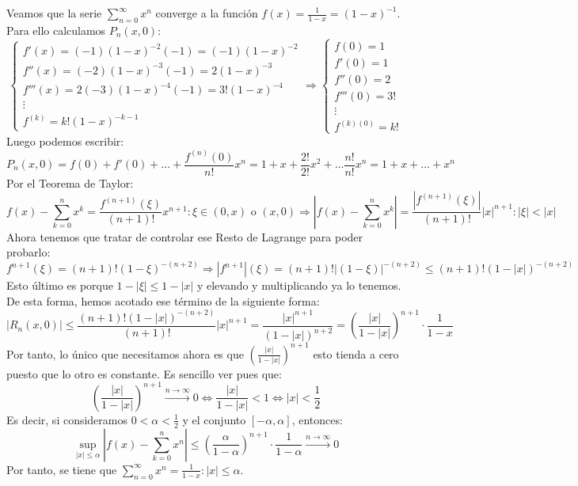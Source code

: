 \documentclass[10pt,a4paper,openright]{book}
\begin{document}
Veamos que la serie $\sum_{n = 0}^{\infty} x^n$ converge a la función $f(x) = \frac{1}{1-x} = (1-x)^{-1}$. Para ello calculamos $P_n(x,0)$:
$$\begin{cases} f'(x) = (-1) (1-x)^{-2} (-1) = (-1) (1-x)^{-2} \\
f''(x) = (-2) (1-x)^{-3} (-1) = 2 (1-x)^{-3} \\
f'''(x) = 2 (-3) (1-x)^{-4} (-1) = 3! (1-x)^{-4} \\
\vdots \\
f^{(k)} = k! (1-x)^{-k - 1}
\end{cases} \Rightarrow \begin{cases} f(0) = 1 \\ f'(0) = 1 \\ f''(0) = 2 \\ f'''(0) = 3! \\ \vdots \\ f^{(k)(0)} = k! \end{cases}$$
Luego podemos escribir:
$$P_n (x, 0) = f(0) + f'(0) + \ldots + \frac{f^{(n)} (0)}{n!} x^n = 1+  x + \frac{2!}{2!} x^2 + \ldots \frac{n!}{n!} x^n = 1+ x + \ldots + x^n$$
Por el Teorema de Taylor:
$$f(x) - \sum_{k=0}^{n} x^k = \frac{f^{(n+1)}(\xi)}{(n+1)!} x^{n+1} : \xi \in (0,x) \mbox{ o } (x, 0) \Rightarrow \left| f(x) - \sum_{k=0}^{n} x^k \right|= \frac{|f^{(n+1)} (\xi)|}{(n+1)!} |x|^{n+1} : |\xi| < |x|$$
Ahora tenemos que tratar de controlar ese Resto de Lagrange para poder probarlo:
$$f^{n+1} (\xi) = (n+1)! (1-\xi)^{- (n+2)} \Rightarrow |f^{n+1}| (\xi) = (n+1)! |(1-\xi)|^{- (n+2)} \leq (n+1)! (1 - |x|)^{- (n+2)} $$
Esto último es porque $1-|\xi| \leq 1 - |x|$ y elevando y multiplicando ya lo tenemos. De esta forma, hemos acotado ese término de la siguiente forma:
$$|R_n (x,0) | \leq \frac{(n+1) ! (1 - |x|)^{- (n+2)} }{(n+1)!} |x|^{n+1} = \frac{|x|^{n+1}}{(1 - |x|)^ {n+2}} = \left(\frac{|x|}{1-|x|}\right)^{n+1} \cdot \frac{1}{1-x}$$
Por tanto, lo único que necesitamos ahora es que $\left(\frac{|x|}{1-|x|}\right)^{n+1}$ esto tienda a cero puesto que lo otro es constante. Es sencillo ver pues que:
$$\left(\frac{|x|}{1-|x|}\right)^{n+1} \xrightarrow{n\rightarrow\infty} 0\Leftrightarrow \frac{|x|}{1-|x|} < 1 \Leftrightarrow |x| < \frac{1}{2}$$
Es decir, si consideramos  $0 < \alpha < \frac{1}{2}$ y el conjunto $[-\alpha, \alpha]$, entonces:
$$\underset{|x| \leq \alpha} {\sup} \left|f(x) - \sum_{k=0}^{n} x^n\right| \leq \left(\frac{\alpha}{1 - \alpha}\right)^{n+1} \cdot \frac{1}{1-\alpha} \xrightarrow{n\rightarrow\infty} 0$$
Por tanto, se tiene que $\sum_{n=0}^{\infty} x^n = \frac{1}{1-x} : |x| \leq \alpha$.
\end{document}
